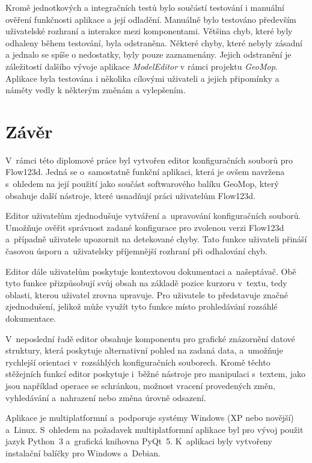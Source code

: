 \documentclass[FM,bw,DP]{tulthesis}
\begin{document}
Kromě jednotkových a integračních testů bylo součástí testování i manuální ověření funkčnosti aplikace a její odladění. Manuálně bylo testováno především uživatelské rozhraní a interakce mezi komponentami. Většina chyb, které byly odhaleny během testování, byla odstraněna. Některé chyby, které nebyly zásadní a jednalo se spíše o nedostatky, byly pouze zaznamenány. Jejich odstranění je záležitostí dalšího vývoje aplikace \textit{ModelEditor} v rámci projektu \textit{GeoMop}. Aplikace byla testována i několika cílovými uživateli a jejich připomínky a náměty vedly k některým změnám a vylepšením.


\chapter*{Závěr}
V~rámci této diplomové práce byl vytvořen editor konfiguračních souborů pro Flow123d. Jedná se o~samostatně funkční aplikaci, která je ovšem navržena s~ohledem na její použití jako součást softwarového balíku GeoMop, který obsahuje další nástroje, které usnadňují práci uživatelům Flow123d.

Editor uživatelům zjednodušuje vytváření a~upravování konfiguračních souborů. Umožňuje ověřit správnost zadané konfigurace pro zvolenou verzi Flow123d a~případně uživatele upozornit na detekované chyby. Tato funkce uživateli přináší časovou úsporu a~uživatelsky příjemnější rozhraní při odhalování chyb.

Editor dále uživatelům poskytuje kontextovou dokumentaci a~našeptávač. Obě tyto funkce přizpůsobují svůj obsah na základě pozice kurzoru v~textu, tedy oblasti, kterou uživatel zrovna upravuje. Pro uživatele to představuje značné zjednodušení, jelikož může využít tyto funkce místo prohledávání rozsáhlé dokumentace.

V~neposlední řadě editor obsahuje komponentu pro grafické znázornění datové struktury, která poskytuje alternativní pohled na zadaná data, a~umožňuje rychlejší orientaci v~rozsáhlých konfiguračních souborech. Kromě těchto stěžejních funkcí editor poskytuje i~běžné nástroje pro manipulaci s~textem, jako jsou například operace se schránkou, možnost vracení provedených změn, vyhledávání a~nahrazení nebo změna úrovně odsazení.

Aplikace je multiplatformní a~podporuje systémy Windows (XP nebo novější) a~Linux. S~ohledem na požadavek multiplatformní aplikace byl pro vývoj použit jazyk Python~3 a~grafická knihovna PyQt~5. K~aplikaci byly vytvořeny instalační balíčky pro Windows a~Debian.
\end{document}
